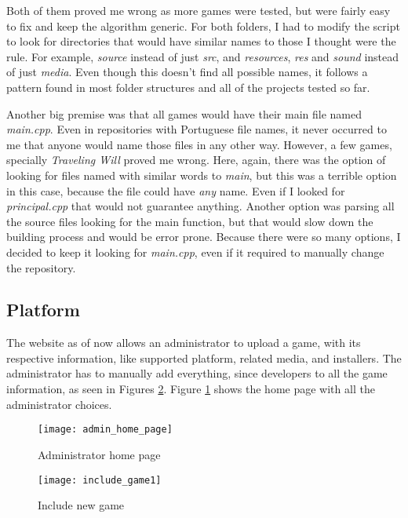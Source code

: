 Both of them proved me wrong as more games were tested, but were fairly easy to fix and keep the algorithm generic. For both folders, I had to modify the script to look for directories that would have similar names to those I thought were the rule. For example, \textit{source} instead of just \textit{src}, and \textit{resources}, \textit{res} and \textit{sound} instead of just \textit{media}. Even though this doesn't find all possible names, it follows a pattern found in most folder structures and all of the projects tested so far.

Another big premise was that all games would have their main file named \textit{main.cpp}. Even in repositories with Portuguese file names, it never occurred to me that anyone would name those files in any other way. However, a few games, specially \textit{Traveling Will} proved me wrong. Here, again, there was the option of looking for files named with similar words to \textit{main}, but this was a terrible option in this case, because the file could have \textit{any} name. Even if I looked for \textit{principal.cpp} that would not guarantee anything. Another option was parsing all the source files looking for the main function, but that would slow down the building process and would be error prone. Because there were so many options, I decided to keep it looking for \textit{main.cpp}, even if it required to manually change the repository.

\subsection[Platform]{Platform}

The website as of now allows an administrator to upload a game, with its respective information, like supported platform, related media, and installers.
The administrator has to manually add everything, since developers to all the game information, as seen in Figures \ref{fig:include_game1}. Figure \ref{fig:admin_home} shows the home page with all the administrator choices.

\begin{figure}[h!]
\centering
\texttt{[image: admin\_home\_page]}
\caption{Administrator home page}
\label{fig:admin_home}
\end{figure}

\begin{figure}[h!]
\centering
\texttt{[image: include\_game1]}
\caption{Include new game}
\label{fig:include_game1}
\end{figure}

